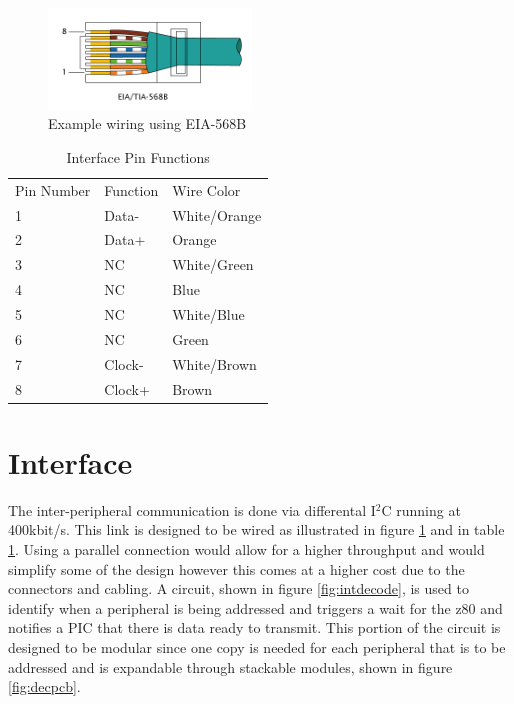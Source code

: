 \documentclass{book}
\begin{document}
\begin{figure}
  \begin{center}
    \includegraphics[width=0.48\textwidth]{RJ-45_TIA-568B_Left.png}
  \end{center}
  \caption[Example wiring using EIA-568B]{Example wiring using EIA-568B\cite{img:eia568}\label{fig:eia568}}
\end{figure}

\begin{table}
\centering
\begin{tabular}{| l | l | l |}
Pin Number & Function & Wire Color\\
1 & Data- & White/Orange\\
2 & Data+ & Orange\\
3 & NC & White/Green\\
4 & NC & Blue\\
5 & NC & White/Blue\\
6 & NC & Green\\
7 & Clock- & White/Brown\\
8 & Clock+ & Brown\\
\end{tabular}
\caption{Interface Pin Functions\label{tab:intpin}}
\end{table}
\section{Interface}
The inter-peripheral communication is done via differental I$^2$C running at 400kbit/s. This link is designed to be wired as illustrated in figure 
\ref{fig:eia568} and in table \ref{tab:intpin}. Using a parallel connection would allow for a higher throughput and would simplify some of the design 
however this comes at a higher cost due to the connectors and cabling. A circuit, shown in figure \ref{fig:intdecode}, is used to identify when a peripheral 
is being addressed and triggers a wait for the z80 and notifies a PIC that there is data ready to transmit. This portion of the circuit is designed to be 
modular since one copy is needed for each peripheral that is to be addressed and is expandable through stackable modules, shown in figure \ref{fig:decpcb}.
\end{document}
